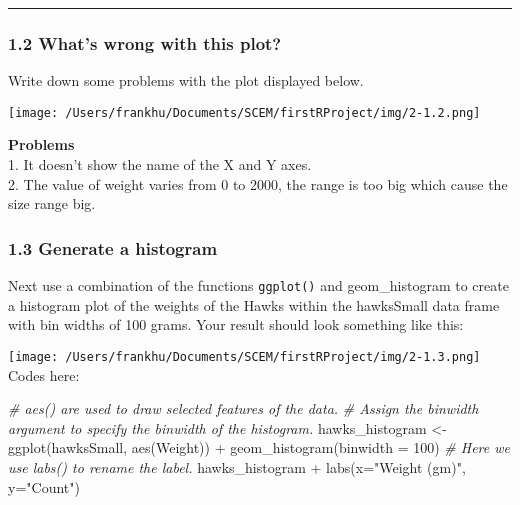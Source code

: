 \documentclass[
]{article}
\newenvironment{Shaded}{\begin{snugshade}}{\end{snugshade}}
\newcommand{\AttributeTok}[1]{\textcolor[rgb]{0.77,0.63,0.00}{#1}}
\newcommand{\CommentTok}[1]{\textcolor[rgb]{0.56,0.35,0.01}{\textit{#1}}}
\newcommand{\DecValTok}[1]{\textcolor[rgb]{0.00,0.00,0.81}{#1}}
\newcommand{\FunctionTok}[1]{\textcolor[rgb]{0.00,0.00,0.00}{#1}}
\newcommand{\NormalTok}[1]{#1}
\newcommand{\OtherTok}[1]{\textcolor[rgb]{0.56,0.35,0.01}{#1}}
\newcommand{\SpecialCharTok}[1]{\textcolor[rgb]{0.00,0.00,0.00}{#1}}
\newcommand{\StringTok}[1]{\textcolor[rgb]{0.31,0.60,0.02}{#1}}
\begin{document}
\begin{center}\rule{0.5\linewidth}{0.5pt}\end{center}

\hypertarget{whats-wrong-with-this-plot}{%
\subsubsection{1.2 What's wrong with this
plot?}\label{whats-wrong-with-this-plot}}

Write down some problems with the plot displayed below.

\texttt{[image: /Users/frankhu/Documents/SCEM/firstRProject/img/2-1.2.png]}

\textbf{Problems}\\
1. It doesn't show the name of the X and Y axes.\\
2. The value of weight varies from 0 to 2000, the range is too big which
cause the size range big.

\hypertarget{generate-a-histogram}{%
\subsubsection{1.3 Generate a histogram}\label{generate-a-histogram}}

Next use a combination of the functions \texttt{ggplot()} and
geom\_histogram to create a histogram plot of the weights of the Hawks
within the hawksSmall data frame with bin widths of 100 grams. Your
result should look something like this:

\texttt{[image: /Users/frankhu/Documents/SCEM/firstRProject/img/2-1.3.png]}
Codes here:

\begin{Shaded}
\begin{Highlighting}[]
\CommentTok{\# aes() are used to draw selected features of the data.}
\CommentTok{\# Assign the binwidth argument to specify the binwidth of the histogram.}
\NormalTok{hawks\_histogram }\OtherTok{\textless{}{-}} \FunctionTok{ggplot}\NormalTok{(hawksSmall, }\FunctionTok{aes}\NormalTok{(Weight)) }\SpecialCharTok{+} \FunctionTok{geom\_histogram}\NormalTok{(}\AttributeTok{binwidth =} \DecValTok{100}\NormalTok{)}
\CommentTok{\# Here we use labs() to rename the label.}
\NormalTok{hawks\_histogram }\SpecialCharTok{+} \FunctionTok{labs}\NormalTok{(}\AttributeTok{x=}\StringTok{"Weight (gm)"}\NormalTok{, }\AttributeTok{y=}\StringTok{"Count"}\NormalTok{)}
\end{Highlighting}
\end{Shaded}
\end{document}
